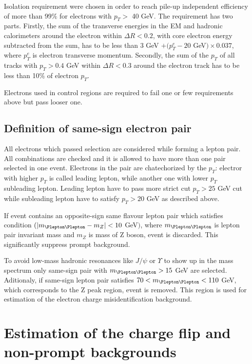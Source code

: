 Isolation requirement were chosen in order to reach pile-up independent efficiency of more than 99$\%$ for electrons 
with $p_T >$ 40 GeV. The requirement has two parts.
Firstly, the sum of the transverse energies in the EM and hadronic calorimeters around the electron within 
$\Delta R < 0.2$, with core electron energy subtracted from the sum, has to be less than 
3 GeV $+ (p_T^e - 20$ GeV$) \times 0.037$, where $p_T^e$ is electron transverse momentum.
Secondly, the sum of the $p_T$ of all tracks with $p_T > 0.4$ GeV within $\Delta R < 0.3$ around the electron track has
to be less than 10$\%$ of electron $p_T$.

Electrons used in control regions are required to fail one or few requirements above but pass looser one.

\subsection{Definition of same-sign electron pair}
All electrons which passed selection are considered while forming a lepton pair.
All combinations are checked and it is allowed to have more than one pair selected in one event.
Electrons in the pair are chatechorized by the $p_T$: electror with higher $p_T$ is called leading lepton, while another one with lower $p_T$ subleading lepton.
Leading lepton have to pass more strict cut $p_T>25$ GeV cut while subleading lepton have to satisfy $p_T>20$ GeV as described above.

If event contains an opposite-sign same flavour lepton pair which satisfies condition $( |m_{\Plepton\Plepton} - m_{Z}| < 10$ GeV$)$,
where $m_{\Plepton\Plepton}$ is lepton pair invariant mass and $m_{Z}$ is mass of Z boson, event is discarded.
This significantly suppress prompt background.

To avoid low-mass hadronic resonances like $J/\psi$ or $\varUpsilon$ to show up in the mass spectrum only same-sign pair with $m_{\Plepton\Plepton}>15$ GeV are selected.
Aditionaly, if same-sign lepton pair satisfies $70 < m_{\Plepton\Plepton}< 110$ GeV, which corresponds to the Z peak region, event is removed.
This region is used for estimation of the electron charge misidentification background.

\section{Estimation of the charge flip and non-prompt backgrounds}

